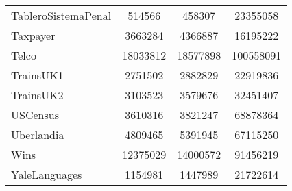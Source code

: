 \begin{table}
\begin{tabular}{|l|c|c|c|}
TableroSistemaPenal & 514566 & 458307 & 23355058 \\
Taxpayer & 3663284 & 4366887 & 16195222 \\
Telco & 18033812 & 18577898 & 100558091 \\
TrainsUK1 & 2751502 & 2882829 & 22919836 \\
TrainsUK2 & 3103523 & 3579676 & 32451407 \\
USCensus & 3610316 & 3821247 & 68878364 \\
Uberlandia & 4809465 & 5391945 & 67115250 \\
Wins & 12375029 & 14000572 & 91456219 \\
YaleLanguages & 1154981 & 1447989 & 21722614 \\
\bottomrule
\end{tabular}
\end{table}
